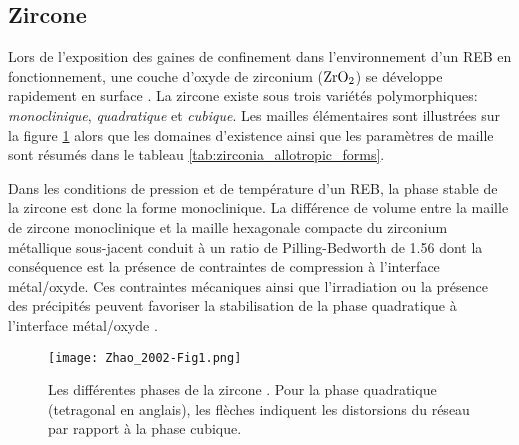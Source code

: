 \begin{refsection}
    \subsection{Zircone}\label{subsubsec:Zircone}

    Lors de l’exposition des gaines de confinement dans l’environnement d’un REB en fonctionnement,
    une couche d'oxyde de zirconium ($\rm ZrO_2$) se développe rapidement en
    surface \citep{Cox2011}. 
    La zircone existe sous trois variétés polymorphiques:
    \emph{monoclinique}, \emph{quadratique} et \emph{cubique}.
    Les mailles élémentaires sont
    illustrées sur la figure \ref{fig:Zirconia_allotropic_forms} alors que les domaines d’existence ainsi que les
    paramètres de maille sont résumés dans le tableau \ref{tab:zirconia_allotropic_forms}.
   

    Dans les conditions de pression et de température d’un REB, la phase stable de
    la zircone est donc la forme monoclinique. La différence de volume entre la
    maille de zircone monoclinique et la maille hexagonale compacte du zirconium métallique
    sous-jacent conduit à un ratio de Pilling-Bedworth de 1.56 dont la conséquence est
    la présence de contraintes de compression à l’interface métal/oxyde. Ces contraintes
    mécaniques ainsi que l'irradiation ou la présence des précipités peuvent favoriser
    la stabilisation de la phase quadratique à l'interface métal/oxyde \citep{IAEA1998}. 

    \begin{figure}[H] 
 		\centering 
 		\texttt{[image: Zhao\_2002-Fig1.png]} 
 		\caption[Les différentes phase de la zircone.]
        {Les différentes phases de la zircone \citep{Zhao2002}.
        Pour la phase quadratique (tetragonal en anglais), les flèches indiquent les distorsions du réseau par rapport à la phase cubique.} 
 		\label{fig:Zirconia_allotropic_forms} 
 	\end{figure}



\end{refsection}
